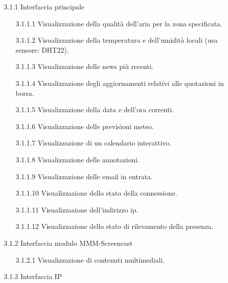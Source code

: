 \documentclass[a4paper,11pt,titlepage]{article}       %
\begin{document}
        \begin{itemize}
            \item[3.1.1] Interfaccia principale
                \begin{itemize}
                    \item[3.1.1.1] Visualizzazione della qualità dell'aria per la zona specificata.
                    \item[3.1.1.2] Visualizzazione della temperatura e dell'umidità locali (usa sensore: DHT22).
                    \item[3.1.1.3] Visualizzazione delle news più recenti.
                    \item[3.1.1.4] Visualizzazione degli aggiornamenti relativi alle quotazioni in borsa.
                    \item[3.1.1.5] Visualizzazione della data e dell'ora correnti.
                    \item[3.1.1.6] Visualizzazione delle previsioni meteo.
                    \item[3.1.1.7] Visualizzazione di un calendario interattivo.
                    \item[3.1.1.8] Visualizzazione delle annotazioni.
                    \item[3.1.1.9] Visualizzazione delle email in entrata.
                    \item[3.1.1.10] Visualizzazione dello stato della connessione.
                    \item[3.1.1.11] Visualizzazione dell'indirizzo ip.
                    \item[3.1.1.12] Visualizzazione dello stato di rilevamento della presenza.
                \end{itemize}   
                
            \item[3.1.2] Interfaccia modulo MMM-Screencast
                \begin{itemize}
                    \item[3.1.2.1] Visualizzazione di contenuti multimediali.
                \end{itemize}
            \item[3.1.3] Interfaccia IP
        \end{itemize}
    
\end{document}
